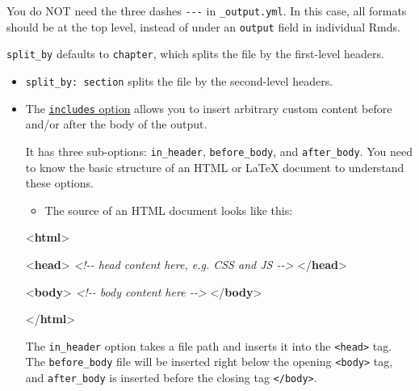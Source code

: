 \documentclass[
]{book}
\newenvironment{Shaded}{\begin{snugshade}}{\end{snugshade}}
\newcommand{\CommentTok}[1]{\textcolor[rgb]{0.56,0.35,0.01}{\textit{#1}}}
\newcommand{\DataTypeTok}[1]{\textcolor[rgb]{0.13,0.29,0.53}{#1}}
\newcommand{\KeywordTok}[1]{\textcolor[rgb]{0.13,0.29,0.53}{\textbf{#1}}}
\providecommand{\tightlist}{%
  \setlength{\itemsep}{0pt}\setlength{\parskip}{0pt}}
\theoremstyle{definition}
\theoremstyle{definition}
\theoremstyle{definition}
\theoremstyle{definition}
\theoremstyle{remark}
\begin{document}
You do NOT need the three dashes \texttt{-\/-\/-} in \texttt{\_output.yml}. In this case, all formats should be at the top level, instead of under an \texttt{output} field in individual Rmds.

\texttt{split\_by} defaults to \texttt{chapter}, which splits the file by the first-level headers.

\begin{itemize}
\item
  \texttt{split\_by:\ section} splits the file by the second-level headers.
\item
  The \href{https://bookdown.org/yihui/bookdown/yaml-options.html}{\texttt{includes} option} allows you to insert arbitrary custom content before and/or after the body of the output.

  It has three sub-options: \texttt{in\_header}, \texttt{before\_body}, and \texttt{after\_body}. You need to know the basic structure of an HTML or LaTeX document to understand these options.

  \begin{itemize}
  \tightlist
  \item
    The source of an HTML document looks like this:
  \end{itemize}

\begin{Shaded}
\begin{Highlighting}[]
\DataTypeTok{\textless{}}\KeywordTok{html}\DataTypeTok{\textgreater{}}

  \DataTypeTok{\textless{}}\KeywordTok{head}\DataTypeTok{\textgreater{}}
  \CommentTok{\textless{}!{-}{-} head content here, e.g. CSS and JS {-}{-}\textgreater{}}
  \DataTypeTok{\textless{}/}\KeywordTok{head}\DataTypeTok{\textgreater{}}

  \DataTypeTok{\textless{}}\KeywordTok{body}\DataTypeTok{\textgreater{}}
  \CommentTok{\textless{}!{-}{-} body content here {-}{-}\textgreater{}}
  \DataTypeTok{\textless{}/}\KeywordTok{body}\DataTypeTok{\textgreater{}}

\DataTypeTok{\textless{}/}\KeywordTok{html}\DataTypeTok{\textgreater{}}
\end{Highlighting}
\end{Shaded}

  The \texttt{in\_header} option takes a file path and inserts it into the \texttt{\textless{}head\textgreater{}} tag. The \texttt{before\_body} file will be inserted right below the opening \texttt{\textless{}body\textgreater{}} tag, and \texttt{after\_body} is inserted before the closing tag \texttt{\textless{}/body\textgreater{}}.


\end{itemize}
\end{document}
